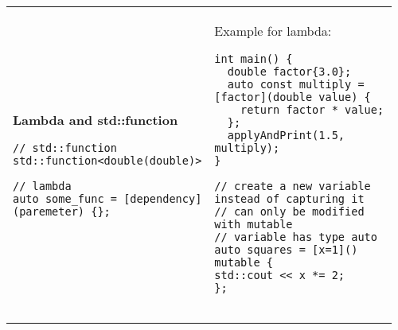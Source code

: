 \documentclass[main.tex,fontsize=8pt,paper=a4,paper=portrait,DIV=calc,]{scrartcl}
\begin{document}
\pagebreak
\begin{table}[ht!]
\begin{tabular}{|m{0.2\linewidth}|m{0.755\linewidth}|}
\hline
\textbf{Lambda and std::function}\newline
\begin{lstlisting}
// std::function
std::function<double(double)>

// lambda 
auto some_func = [dependency](paremeter) {};
\end{lstlisting}
& Example for lambda:\newline
\begin{lstlisting}
int main() {
  double factor{3.0};
  auto const multiply = [factor](double value) {
    return factor * value;
  };
  applyAndPrint(1.5, multiply);
}

// create a new variable instead of capturing it
// can only be modified with mutable
// variable has type auto
auto squares = [x=1]() mutable {
std::cout << x *= 2;
};


\end{lstlisting}
\end{tabular}
\end{table}
\end{document}
